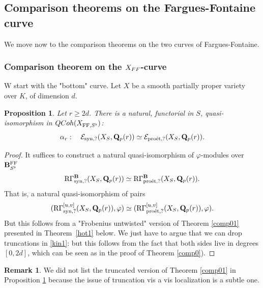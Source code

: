 \documentclass[10pt,reqno]{amsart}
\newtheorem{proposition}[equation]{Proposition}
\theoremstyle{definition}
\newtheorem{remark}[equation]{Remark}
\theoremstyle{remark}
\def\phi{\varphi}
\newcommand{\proeet}{\operatorname{pro\acute{e}t} }
\newcommand{\synt}{ \operatorname{syn} }
\newcommand{\FF}{\operatorname{FF} }
\newcommand{\se}{{\mathcal{E}}}
\numberwithin{equation}{section}
\def\R{{\mathrm R}}
\def\Q{{\bf Q}} \def\Z{{\bf Z}}
\numberwithin{equation}{section}
\begin{document}
 \subsection{Comparison theorems on the Fargues-Fontaine curve} 
We move now to the comparison theorems on the two curves of Fargues-Fontaine. 
\subsubsection{Comparison theorem on the $X_{\rm FF}$-curve} W start with the "bottom" curve. Let $X$ be a smooth partially proper variety over $K$, of dimension $d$. 
 \begin{proposition} \label{china1}
Let $r\geq 2d$.
There is a   natural, functorial in $S$,  quasi-isomorphism in ${\rm QCoh}(X_{\FF,S^{\flat}})$:
\begin{equation}\label{hot11}
\alpha_r:\quad \se_{\synt,?}(X_S,\Q_p(r)) \simeq \se_{\proeet,?}(X_S,\Q_p(r)).
\end{equation}
 \end{proposition}
\begin{proof}  It suffices  to construct a natural quasi-isomorphism of $\phi$-modules over $\B^{\FF}_{S^{\flat}}$
$$
\R\Gamma^{\B}_{\synt,?}(X_S,\Q_p(r))\simeq \R\Gamma^{\B}_{\proeet,?}(X_S,\Q_p(r)).
$$
That is, a natural quasi-isomorphism of pairs
$$
(\R\Gamma^{{[u,v]}}_{\synt,?}(X_S,\Q_p(r)),\phi)\simeq  (\R\Gamma^{{[u,v]}}_{\proeet,?}(X_S,\Q_p(r)),\phi).
$$
 But this  follows 
   from a "Frobenius untwisted" version of  Theorem \ref{comp01} presented in Theorem~\ref{hot1} below. We just have to argue that we can drop truncations in \ref{kin1}: but this follows from the fact that both sides live in degrees $[0,2d]$, which can be seen   as in the proof of Theorem \eqref{comp0}).    \end{proof}
   \begin{remark}
   We did not list the truncated version of Theorem \ref{comp01} in Proposition \ref{china1} because the issue of truncation vis a vis localization is a subtle one.
   \end{remark}
\end{document}
